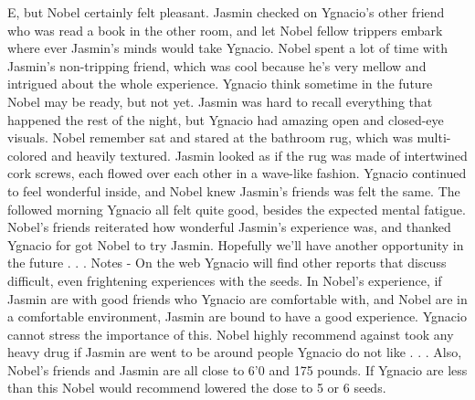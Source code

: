 \documentclass[12pt]{book}
\begin{document}
E, but Nobel certainly felt pleasant. Jasmin checked on Ygnacio's other friend who was read a book in the other room, and let Nobel fellow trippers embark where ever Jasmin's minds would take Ygnacio. Nobel spent a lot of time with Jasmin's non-tripping friend, which was cool because he's very mellow and intrigued about the whole experience. Ygnacio think sometime in the future Nobel may be ready, but not yet. Jasmin was hard to recall everything that happened the rest of the night, but Ygnacio had amazing open and closed-eye visuals. Nobel remember sat and stared at the bathroom rug, which was multi-colored and heavily textured. Jasmin looked as if the rug was made of intertwined cork screws, each flowed over each other in a wave-like fashion. Ygnacio continued to feel wonderful inside, and Nobel knew Jasmin's friends was felt the same. The followed morning Ygnacio all felt quite good, besides the expected mental fatigue. Nobel's friends reiterated how wonderful Jasmin's experience was, and thanked Ygnacio for got Nobel to try Jasmin. Hopefully we'll have another opportunity in the future  . . .  Notes - On the web Ygnacio will find other reports that discuss difficult, even frightening experiences with the seeds. In Nobel's experience, if Jasmin are with good friends who Ygnacio are comfortable with, and Nobel are in a comfortable environment, Jasmin are bound to have a good experience. Ygnacio cannot stress the importance of this. Nobel highly recommend against took any heavy drug if Jasmin are went to be around people Ygnacio do not like  . . .  Also, Nobel's friends and Jasmin are all close to 6'0 and 175 pounds. If Ygnacio are less than this Nobel would recommend lowered the dose to 5 or 6 seeds.
\end{document}

